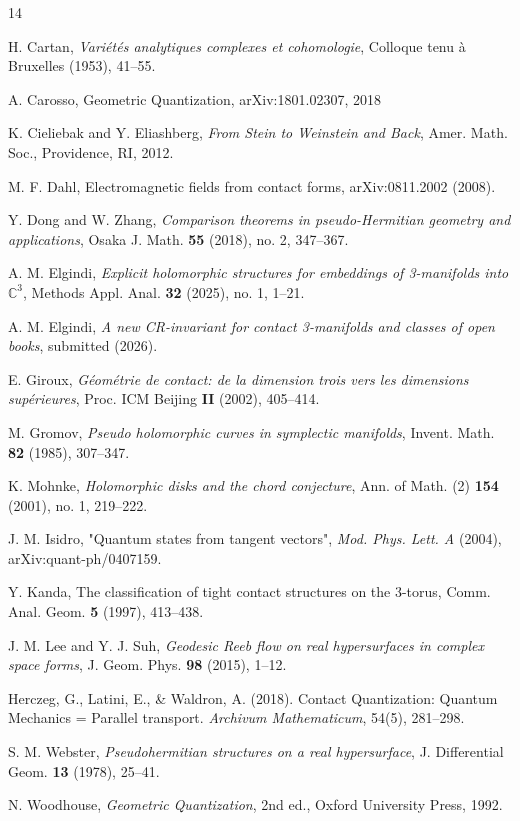 \documentclass[12pt]{article}
\newcommand{\C}{\mathbb{C}}
\begin{document}
\newpage
\begin{thebibliography}{14}



 H. Cartan, \textit{Variétés analytiques complexes et cohomologie}, Colloque tenu à Bruxelles (1953), 41–55. 

  A. Carosso, Geometric Quantization, arXiv:1801.02307, {2018} 

K. Cieliebak and Y. Eliashberg, \textit{From Stein to Weinstein and Back}, Amer. Math. Soc., Providence, RI, 2012.

 M. F. Dahl,  {Electromagnetic fields from contact forms}, arXiv:0811.2002 (2008).  

Y. Dong and W. Zhang,
\textit{Comparison theorems in pseudo-Hermitian geometry and applications}, Osaka J. Math. \textbf{55} (2018), no. 2, 347–367.

A. M. Elgindi, \textit{Explicit holomorphic structures for embeddings of 3-manifolds into $\C^3$}, Methods Appl. Anal. \textbf{32} (2025), no. 1, 1–21.

A. M. Elgindi, \textit{A new CR-invariant for contact 3-manifolds and classes of open books}, submitted (2026).

E. Giroux, \textit{Géométrie de contact: de la dimension trois vers les dimensions supérieures}, Proc. ICM Beijing \textbf{II} (2002), 405–414.

M. Gromov,
\textit{Pseudo holomorphic curves in symplectic manifolds},
Invent. Math. \textbf{82} (1985), 307–347.

K. Mohnke,
\textit{Holomorphic disks and the chord conjecture},
Ann. of Math. (2) \textbf{154} (2001), no. 1, 219–222.

 J. M. Isidro, "Quantum states from tangent vectors", \textit{Mod. Phys. Lett. A} (2004), arXiv:quant-ph/0407159. 

 Y. Kanda, {The classification of tight contact structures on the 3-torus}, Comm. Anal. Geom. \textbf{5} (1997), 413–438. 

J. M. Lee and Y. J. Suh, \textit{Geodesic Reeb flow on real hypersurfaces in complex space forms}, J. Geom. Phys. \textbf{98} (2015), 1–12.

 Herczeg, G., Latini, E., \& Waldron, A. (2018). Contact Quantization: Quantum Mechanics = Parallel transport. \textit{Archivum Mathematicum}, 54(5), 281–298. 

S. M. Webster, \textit{Pseudohermitian structures on a real hypersurface}, J. Differential Geom. \textbf{13} (1978), 25–41.

N. Woodhouse, \textit{Geometric Quantization}, 2nd ed., Oxford University Press, 1992.

\end{thebibliography}
\end{document}
